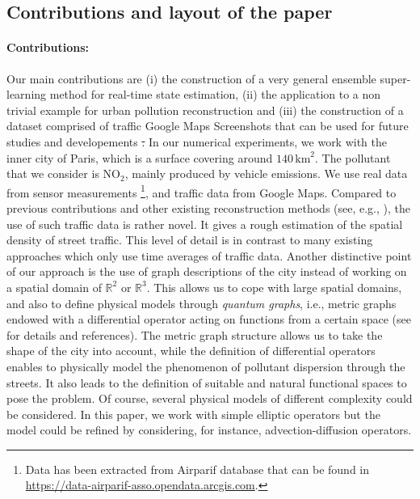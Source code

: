 \documentclass[11pt,a4paper,twoside]{article}
\newcommand{\asmodif}[2]{{\color{teal} #1} {\sout{#2}}}
\theoremstyle{definition}
\numberwithin{equation}{section}
\newcommand{\bR}{\ensuremath{\mathbb{R}}}
\newcommand{\<}{\langle}
\renewcommand{\>}{\rangle}
\begin{document}
\subsection{Contributions and layout of the paper}
\paragraph{Contributions:} Our main contributions are (i) the construction of a very general ensemble super-learning method for real-time state estimation, (ii) the application to a non trivial example for urban pollution reconstruction and \asmodif{(iii) the construction of a dataset comprised of traffic Google Maps Screenshots that can be used for future studies and developements}. In our numerical experiments, we work with the inner city of Paris, which is a surface covering around $140\,\textrm{km}^2$. The pollutant that we consider is $\textrm{NO}_2$, mainly produced by vehicle emissions. We use real data from sensor measurements \footnote{Data has been extracted from Airparif database that can be found in  \url{https://data-airparif-asso.opendata.arcgis.com}.}, and traffic data from Google Maps. Compared to previous contributions and other existing reconstruction methods (see, e.g., \cite{MSM2009, TMPPB2013}), the use of such traffic data is rather novel. It gives a rough estimation of the spatial density of street traffic. This level of detail is in contrast to many existing approaches which only use time averages of traffic data. Another distinctive point of our approach is the use of graph descriptions of the city instead of working on a spatial domain of $\bR^2$ or $\bR^3$. This allows us to cope with large spatial domains, and also to define physical models through \emph{quantum graphs}, i.e., metric graphs  endowed with a differential operator acting on functions from a certain space (see \cite{BK2013} for details and references). The metric graph structure allows us to take the shape of the city into account, while the definition of differential operators enables to physically model the phenomenon of pollutant dispersion through the streets. It also leads to the definition of suitable and natural functional spaces to pose the problem. Of course, several physical models of different complexity could be considered. In this paper, we work with simple elliptic operators but the model could be refined by considering, for instance, advection-diffusion operators. %
\end{document}
